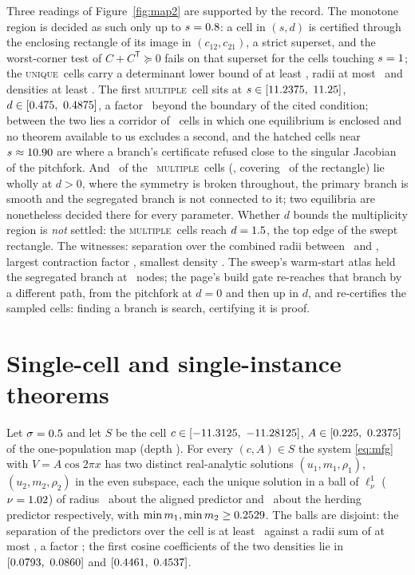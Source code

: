 \documentclass[11pt]{article}
\theoremstyle{definition}
\newcommand{\lnu}{\ell^1_\nu}
\newcommand{\MULT}{\textup{\textsc{multiple}}}
\newcommand{\UNIQ}{\textup{\textsc{unique}}}
\begin{document}
Three readings of Figure~\ref{fig:map2} are supported by the record. The monotone region is decided as such only up to $s=0.8$: a cell in $(s,d)$ is certified through the enclosing rectangle of its image in $(c_{12},c_{21})$, a strict superset, and the worst-corner test of $C+C^{\mathsf T}\succeq0$ fails on that superset for the cells touching $s=1$; the \UNIQ\ cells carry a determinant lower bound of at least \TwoUniqDetMin, radii at most \TwoUniqRMax\ and densities at least \TwoUniqMinM. The first \MULT\ cell sits at $s\in[11.2375,\ 11.25]$, $d\in[0.475,\ 0.4875]$, a factor \TwoGap\ beyond the boundary of the cited condition; between the two lies a corridor of \TwoWhyMonotone\ cells in which one equilibrium is enclosed and no theorem available to us excludes a second, and the hatched cells near $s\approx10.90$ are where a branch's certificate refused close to the singular Jacobian of the pitchfork. And \TwoMultUnreach\ of the \TwoMult\ \MULT\ cells (\TwoMultUnreachPct, covering \TwoMultUnreachAreaPct\ of the rectangle) lie wholly at $d>0$, where the symmetry is broken throughout, the primary branch is smooth and the segregated branch is not connected to it; two equilibria are nonetheless decided there for every parameter. Whether $d$ bounds the multiplicity region is \emph{not} settled: the \MULT\ cells reach $d=1.5$, the top edge of the swept rectangle. The witnesses: separation over the combined radii between \TwoWorstSepRatio\ and \TwoBestSepRatio, largest contraction factor \TwoWorstKappa, smallest density \TwoMinDensity. The sweep's warm-start atlas held the segregated branch at \TwoAtlasSeg\ nodes; the page's build gate re-reaches that branch by a different path, from the pitchfork at $d=0$ and then up in $d$, and re-certifies the sampled cells: finding a branch is search, certifying it is proof.

\section{Single-cell and single-instance theorems}\label{sec:theorems}

\begin{theorem}\label{thm:cell}
Let $\sigma=0.5$ and let $S$ be the cell $c\in[-11.3125,\ -11.28125]$, $A\in[0.225,\ 0.2375]$ of the one-population map (depth \OneTightDepth). For every $(c,A)\in S$ the system \eqref{eq:mfg} with $V=A\cos2\pi x$ has two distinct real-analytic solutions $(u_1,m_1,\rho_1)$, $(u_2,m_2,\rho_2)$ in the even subspace, each the unique solution in a ball of $\lnu$ ($\nu=1.02$) of radius \OneTightRAligned\ about the aligned predictor and \OneTightRHerding\ about the herding predictor respectively, with $\min m_1,\min m_2\ge0.2529$. The balls are disjoint: the separation of the predictors over the cell is at least \OneTightSep\ against a radii sum of at most \OneTightRSum, a factor \OneTightRatio; the first cosine coefficients of the two densities lie in $[0.0793,\ 0.0860]$ and $[0.4461,\ 0.4537]$.
\end{theorem}
\end{document}

